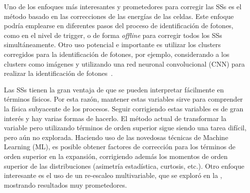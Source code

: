 Uno de los enfoques más interesantes y prometedores para corregir las \acp{SS} es el método basado en las correcciones de las energ\'ias de las celdas. Este enfoque podría emplearse en diferentes pasos del proceso de identificación de fotones, como en el nivel de trigger, o de forma \textit{offline} para corregir todos los \acp{SS} simultáneamente. Otro uso potencial e importante es utilizar los clusters corregidos para la identificación de fotones, por ejemplo, considerando a los clusters como imágenes y utilizando una red neuronal convolucional (CNN) para realizar la identificación de fotones~\cite{thesis_belfkir}.

Las \acp{SS} tienen la gran ventaja de que se pueden interpretar fácilmente en términos físicos. Por esta razón, mantener estas variables sirve para comprender la física subyacente de los procesos. Seguir corrigiendo estas variables es de gran interés y hay varias formas de hacerlo. El método actual de transformar la variable pero utilizando términos de orden superior sigue siendo una tarea difícil, pero aún no explorada. Haciendo uso de las novedosas técnicas de Machine Learning (ML), es posible obtener factores de corrección para los términos de orden superior en la expansión, corrigiendo además los momentos de orden superior de las distribuciones (asimetría estad\'istica, curtosis, etc.). Otro enfoque interesante es el uso de un re-escaleo multivariable, que se exploró en la , mostrando resultados muy prometedores.